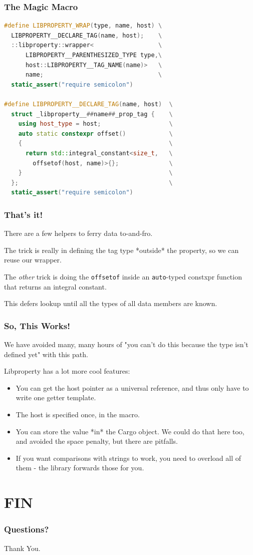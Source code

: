 \documentclass{beamer}
\def\code#1{\texttt{#1}}
\newcommand{\nl}{\vspace{0.2\baselineskip}}
\begin{document}
\begin{frame}[fragile]
\frametitle{The Magic Macro}
\begin{lstlisting}[language=cpp]
#define LIBPROPERTY_WRAP(type, name, host) \
  LIBPROPERTY__DECLARE_TAG(name, host);    \
  ::libproperty::wrapper<                  \
      LIBPROPERTY__PARENTHESIZED_TYPE type,\
      host::LIBPROPERTY__TAG_NAME(name)>   \
      name;                                \
  static_assert("require semicolon")

#define LIBPROPERTY__DECLARE_TAG(name, host)  \
  struct _libproperty__##name##_prop_tag {    \
    using host_type = host;                   \
    auto static constexpr offset()            \
    {                                         \
      return std::integral_constant<size_t,   \
        offsetof(host, name)>{};              \
    }                                         \
  };                                          \
  static_assert("require semicolon")
\end{lstlisting}
\end{frame}

\begin{frame}[fragile]
\frametitle{That's it!}
\begin{center}
  There are a few helpers to ferry data to-and-fro.\nl\nl\nl

  The trick is really in defining the tag type *outside* the property, so we can
  reuse our wrapper. \nl\nl\nl

  The \emph{other} trick is doing the \code{offsetof} inside an
  \code{auto}-typed constxpr function that returns an integral
  constant.\nl\nl\nl

  This defers lookup until all the types of all data members are known.
\end{center}
\end{frame}


\begin{frame}[fragile]
\frametitle{So, This Works!}
\begin{center}
  We have avoided many, many hours of "you can't do this because the type isn't
  defined yet" with this path.\nl\nl\nl

  Libproperty has a lot more cool features:
\end{center}
\begin{itemize}
  \item You can get the host pointer as a universal reference, and thus only
    have to write one getter template.
  \item The host is specified once, in the macro.
  \item You can store the value *in* the Cargo object. We could do that here
    too, and avoided the space penalty, but there are pitfalls.
  \item If you want comparisons with strings to work, you need to overload all
    of them - the library forwards those for you.
\end{itemize}
\end{frame}

\section{FIN}

\begin{frame}[fragile]
\frametitle{Questions?}
\begin{center}
  {\Huge Thank You.}
\end{center}
\end{frame}
\end{document}
